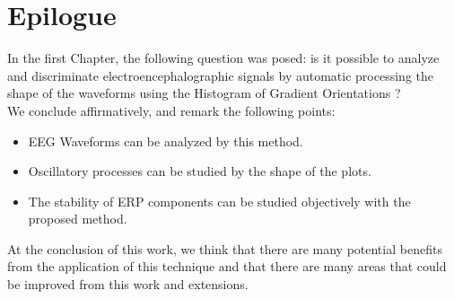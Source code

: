 \chapter{Epilogue}
\label{chapter:seven}


In the first Chapter, the following question was posed:  is it possible to analyze and discriminate electroencephalographic signals by automatic processing the shape of the waveforms using the Histogram of Gradient Orientations ? \\ 


We conclude affirmatively, and remark the following points:

%

\begin{itemize}
\item EEG Waveforms can be analyzed by this method.
\item Oscillatory processes can be studied by the shape of the plots.
\item The stability of ERP components can be studied objectively with the proposed method.
\end{itemize}

At the conclusion of this work, we think that there are many potential benefits from the application of this technique and that there are many areas that could be improved from this work and extensions.   

